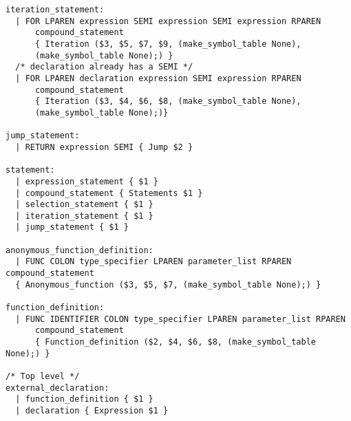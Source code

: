 \begin{verbatim}
iteration_statement:
  | FOR LPAREN expression SEMI expression SEMI expression RPAREN
      compound_statement
      { Iteration ($3, $5, $7, $9, (make_symbol_table None),
      (make_symbol_table None);) }
  /* declaration already has a SEMI */
  | FOR LPAREN declaration expression SEMI expression RPAREN
      compound_statement
      { Iteration ($3, $4, $6, $8, (make_symbol_table None), 
      (make_symbol_table None);)}

jump_statement:
  | RETURN expression SEMI { Jump $2 }

statement:
  | expression_statement { $1 }
  | compound_statement { Statements $1 }
  | selection_statement { $1 }
  | iteration_statement { $1 }
  | jump_statement { $1 }

anonymous_function_definition:
  | FUNC COLON type_specifier LPAREN parameter_list RPAREN compound_statement
  { Anonymous_function ($3, $5, $7, (make_symbol_table None);) }

function_definition:
  | FUNC IDENTIFIER COLON type_specifier LPAREN parameter_list RPAREN
      compound_statement
      { Function_definition ($2, $4, $6, $8, (make_symbol_table None);) }

/* Top level */
external_declaration:
  | function_definition { $1 }
  | declaration { Expression $1 }
\end{verbatim}